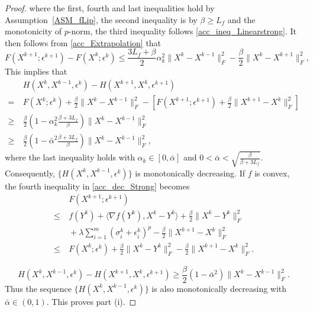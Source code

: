 \documentclass[twoside,11pt]{article}
\numberwithin{equation}{section}
\begin{document}
\begin{proof}
  where the first, fourth and last inequalities  hold by   Assumption~\ref{ASM_fLip}, the second inequality is by $\beta\ge L_{f} $ and the monotonicity of  $p$-norm, the third inequality follows \eqref{acc_ineq_Linearstrong}.
 It then follows from \eqref{acc_Extrapolation} that   
  \begin{equation}
    F (X^{k+1};\epsilon^{k+1})-F (X^{k};\epsilon^{k}) \le \frac{3L_{f}+\beta}{2}\alpha_{k}^{2}\|X^{k}-X^{k-1}\|_{F}^{2}- \frac{\beta}{2}\|X^{k}-X^{k+1}\|_{F}^{2},
  \end{equation}
This implies that 
  \begin{equation}\label{acc_dec_H}
    \begin{aligned}
     &\ H (X^{k},X^{k-1},\epsilon^{k})-H (X^{k+1},X^{k},\epsilon^{k+1}) \\ 
    =&\ F (X^{k};\epsilon^{k})+\frac{\beta}{2}\|X^{k}-X^{k-1}\|_{F}^{2} - \left[F (X^{k+1};\epsilon^{k+1})+\frac{\beta}{2}\|X^{k+1}-X^{k}\|_{F}^{2}\right] \\
    \ge&\ \frac{\beta}{2} \left(1-\alpha_{k}^{2}\frac{\beta+3L_{f}}{\beta}\right)\|X^{k}-X^{k-1}\|_{F}^{2} \\
    \ge&\ \frac{\beta}{2} \left(1-\bar{\alpha}^{2}\frac{\beta+3L_{f}}{\beta}\right)\|X^{k}-X^{k-1}\|_{F}^{2},
  \end{aligned}\end{equation} 
  where   the last inequality holds with $\alpha_{k}\in[0,\bar{\alpha}] $ and $0<\bar{\alpha}<\sqrt{\frac{\beta}{\beta+3L_{f}}} $.
Consequently,  $\{H (X^{k},X^{k-1},\epsilon^{k})\} $ is monotonically decreasing. 
 If $f$ is convex, the fourth inequality in \eqref{acc_dec_Strong} becomes
  \begin{equation}
    \begin{aligned}
      &\ F(X^{k+1};\epsilon^{k+1}) \\
  \le &\ f(Y^{k})+\langle \nabla{f (Y^{k})},X^{k}-Y^{k}\rangle+\frac{\beta}{2}\|X^{k}-Y^{k}\|_{F}^{2}  \\
      &\ +\lambda\sum\limits_{i=1}^{m} (\sigma_i^k+\epsilon_{i}^{k})^{p} - \frac{\beta}{2}\|X^{k+1}-X^{k}\|_{F}^{2} \\
  \le &\ F (X^{k};\epsilon^{k})+\frac{\beta}{2}\|X^{k}-Y^{k}\|_{F}^{2}- \frac{\beta}{2}\|X^{k+1}-X^{k}\|_{F}^{2}.
    \end{aligned}
  \end{equation}

  \begin{equation}
    H (X^{k},X^{k-1},\epsilon^{k})-H (X^{k+1},X^{k},\epsilon^{k+1}) \ge
    \frac{\beta}{2} (1-\bar{\alpha}^{2})\|X^{k}-X^{k-1}\|_{F}^{2}.
  \end{equation}
  Thus the sequence $\{H (X^{k},X^{k-1},\epsilon^{k})\} $ is also monotonically decreasing with $\bar{\alpha}\in (0,1) $. This proves part (i).
  

\end{proof}
\end{document}

